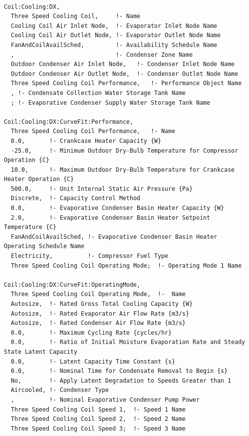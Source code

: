 \begin{lstlisting}

Coil:Cooling:DX,
  Three Speed Cooling Coil,     !- Name
  Cooling Coil Air Inlet Node,  !- Evaporator Inlet Node Name
  Cooling Coil Air Outlet Node, !- Evaporator Outlet Node Name
  FanAndCoilAvailSched,         !- Availability Schedule Name
  ,                             !- Condenser Zone Name
  Outdoor Condenser Air Inlet Node,   !- Condenser Inlet Node Name
  Outdoor Condenser Air Outlet Node,  !- Condenser Outlet Node Name
  Three Speed Cooling Coil Performance,   !- Performance Object Name
  , !- Condensate Collection Water Storage Tank Name
  ; !- Evaporative Condenser Supply Water Storage Tank Name

Coil:Cooling:DX:CurveFit:Performance,
  Three Speed Cooling Coil Performance,   !- Name
  0.0,       !- Crankcase Heater Capacity {W}
  -25.0,     !- Minimum Outdoor Dry-Bulb Temperature for Compressor Operation {C}
  10.0,      !- Maximum Outdoor Dry-Bulb Temperature for Crankcase Heater Operation {C}
  500.0,     !- Unit Internal Static Air Pressure {Pa}
  Discrete,  !- Capacity Control Method
  0.0,       !- Evaporative Condenser Basin Heater Capacity {W}
  2.0,       !- Evaporative Condenser Basin Heater Setpoint Temperature {C}
  FanAndCoilAvailSched, !- Evaporative Condenser Basin Heater Operating Schedule Name
  Electricity,          !- Compressor Fuel Type
  Three Speed Cooling Coil Operating Mode;  !- Operating Mode 1 Name

Coil:Cooling:DX:CurveFit:OperatingMode,
  Three Speed Cooling Coil Operating Mode,  !-  Name
  Autosize,  !- Rated Gross Total Cooling Capacity {W}
  Autosize,  !- Rated Evaporator Air Flow Rate {m3/s}
  Autosize,  !- Rated Condenser Air Flow Rate {m3/s}
  0.0,       !- Maximum Cycling Rate {cycles/hr}
  0.0,       !- Ratio of Initial Moisture Evaporation Rate and Steady State Latent Capacity
  0.0,       !- Latent Capacity Time Constant {s}
  0.0,       !- Nominal Time for Condensate Removal to Begin {s}
  No,        !- Apply Latent Degradation to Speeds Greater than 1
  Aircooled, !- Condenser Type
  ,          !- Nominal Evaporative Condenser Pump Power
  Three Speed Cooling Coil Speed 1,  !- Speed 1 Name
  Three Speed Cooling Coil Speed 2,  !- Speed 2 Name
  Three Speed Cooling Coil Speed 3;  !- Speed 3 Name


\end{lstlisting}
